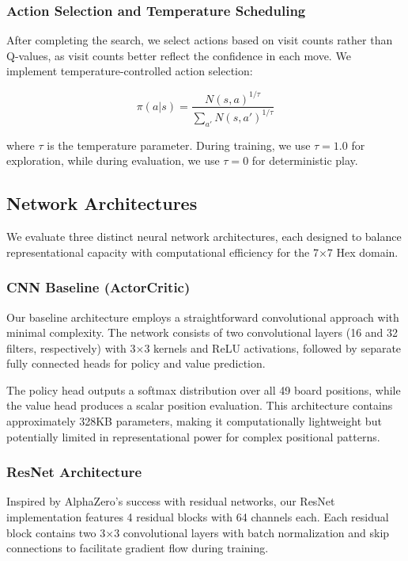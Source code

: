 \documentclass[conference]{IEEEtran}
\begin{document}
\subsubsection{Action Selection and Temperature Scheduling}

After completing the search, we select actions based on visit counts rather than Q-values, as visit counts better reflect the confidence in each move. We implement temperature-controlled action selection:

\begin{equation}
\pi(a|s) = \frac{N(s,a)^{1/\tau}}{\sum_{a'} N(s,a')^{1/\tau}}
\end{equation}

where $\tau$ is the temperature parameter. During training, we use $\tau = 1.0$ for exploration, while during evaluation, we use $\tau = 0$ for deterministic play.

\subsection{Network Architectures}

We evaluate three distinct neural network architectures, each designed to balance representational capacity with computational efficiency for the 7×7 Hex domain.

\subsubsection{CNN Baseline (ActorCritic)}

Our baseline architecture employs a straightforward convolutional approach with minimal complexity. The network consists of two convolutional layers (16 and 32 filters, respectively) with 3×3 kernels and ReLU activations, followed by separate fully connected heads for policy and value prediction.

The policy head outputs a softmax distribution over all 49 board positions, while the value head produces a scalar position evaluation. This architecture contains approximately 328KB parameters, making it computationally lightweight but potentially limited in representational power for complex positional patterns.

\subsubsection{ResNet Architecture}

Inspired by AlphaZero's success with residual networks, our ResNet implementation features 4 residual blocks with 64 channels each. Each residual block contains two 3×3 convolutional layers with batch normalization and skip connections to facilitate gradient flow during training.
\end{document}
